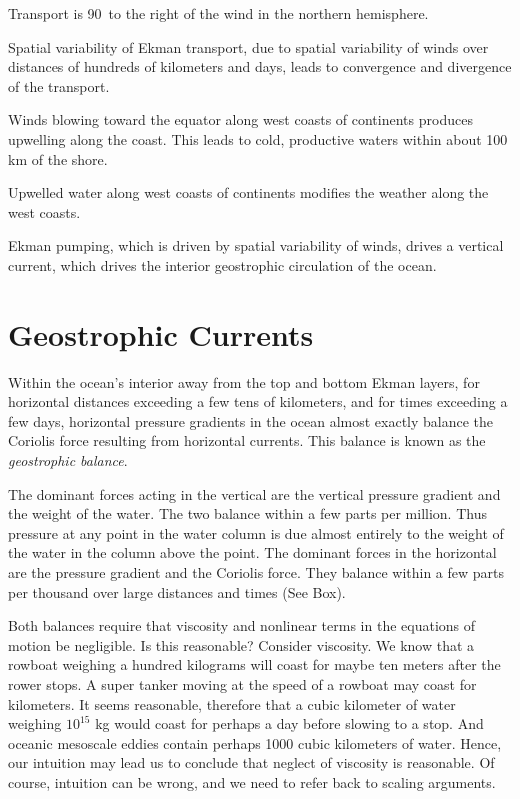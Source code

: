 \begin{enumerate}
\vitem Transport is 90\degrees\ to the right of the wind in the
northern hemisphere.

\vitem Spatial variability of Ekman transport, due to spatial
variability of winds over distances of hundreds of kilometers and
days, leads to convergence and divergence of the transport.
\begin{enumerate}
\vitem Winds blowing toward the equator along west coasts of
continents produces upwelling along the
coast. This leads to cold, productive waters within about 100 km of
the shore.

\vitem Upwelled water along west coasts of continents modifies the
weather along the west coasts.
\end{enumerate}

\vitem Ekman pumping, which is driven by spatial
variability of winds, drives a vertical current, which drives the
interior geostrophic circulation of the
ocean.
\end{enumerate}


\chapter{Geostrophic Currents}
Within the ocean's interior away from the top and bottom Ekman
layers, for horizontal distances exceeding a few
tens of kilometers, and for times exceeding a few days, horizontal
pressure gradients in the ocean almost exactly balance the Coriolis
force resulting from horizontal currents. This balance is known as the
\textit{geostrophic balance}.

The dominant forces acting in the vertical are the vertical pressure
gradient and the weight of the water. The two balance within a few
parts per million. Thus pressure at any point in the water column is
due almost entirely to the weight of the water in the column above the
point. The dominant forces in the horizontal are the pressure gradient
and the Coriolis force. They balance within a few parts per thousand
over large distances and times (See Box).

Both balances require that viscosity and nonlinear terms in the
equations of motion be negligible. Is this reasonable? Consider
viscosity. We know that a rowboat weighing a hundred kilograms will
coast for maybe ten meters after the rower stops. A super tanker
moving at the speed of a rowboat may coast for kilometers. It seems
reasonable, therefore that a cubic kilometer of water weighing
$10^{15}$ kg would coast for perhaps a day before slowing to a
stop. And oceanic mesoscale eddies contain
perhaps 1000 cubic kilometers of water. Hence, our intuition may lead
us to conclude that neglect of viscosity is reasonable.  Of course,
intuition can be wrong, and we need to refer back to scaling
arguments.

